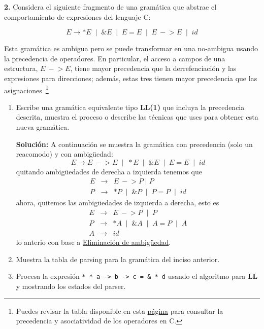 \textbf{2.} Considera el siguiente fragmento de una gram\'atica que abstrae el 
comportamiento de expresiones del lenguaje \textsf{C}:

\[
E \to *E \;\mid\; \&E \;\mid\; E = E \;\mid\; E\ -\!> E \;\mid\; id
\]

Esta gram\'atica es ambigua pero se puede transformar en una no-ambigua usando
la precedencia de operadores.
En particular, el acceso a campos de una estructura, $E\ -\!> E$, tiene mayor 
precedencia que la derrefenciaci\'on y las expresiones para direcciones; 
adem\'as, estas tres tienen mayor precedencia que las 
asignaciones~\footnote{Puedes revisar la tabla disponible en esta 
\href{https://justdocodings.blogspot.com/2018/06/operator-precedence-and-associativity.html}{p\'agina} 
para consultar la precedencia y asociatividad de los operadores en \textsc{C}.}
\begin{enumerate}
\item Escribe una gram\'atica equivalente tipo \textbf{LL(1)} que incluya la
precedencia descrita, muestra el proceso o describe las técnicas que uses para 
obtener esta nueva gramática.

\textbf{Solución:} A continuación se muestra la gramática con precedencia (solo un reacomodo)
y con ambig\"uedad:
\[ E \to E\ -\!> E \;\mid\; *E \;\mid\; \&E \;\mid\; E = E \;\mid\; id\]
quitando ambig\"uedades de derecha a izquierda tenemos que
\begin{eqnarray*}
         E &\to& E\ -\!> P\; |\; P\\
         P &\to& *P \;\mid\; \&P \;\mid\; P = P \;\mid\; id
\end{eqnarray*}
ahora, quitemos las ambig\"uedades de izquierda a derecha, esto es
\begin{eqnarray*}
         E &\to& E\ -\!> P\;\mid\; P\\
         P &\to& *A \;\mid\; \&A \;\mid\; A = P \;\mid\; A \\
         A &\to& id
\end{eqnarray*}
lo anterio con base a \href{https://barcelonageeks.com/eliminacion-de-ambiguedad-conversion-de-una-gramatica-ambigua-en-gramatica-inequivoca/}{Eliminaci\'on de ambig\"uedad}. 
\item Muestra la tabla de parsing para la gram\'atica del inciso anterior.

\item Procesa la expresi\'on
\verb!* * a -> b -> c = & * d!  usando el algoritmo para \textbf{LL} y 
mostrando los estados del parser. 
\end{enumerate}
